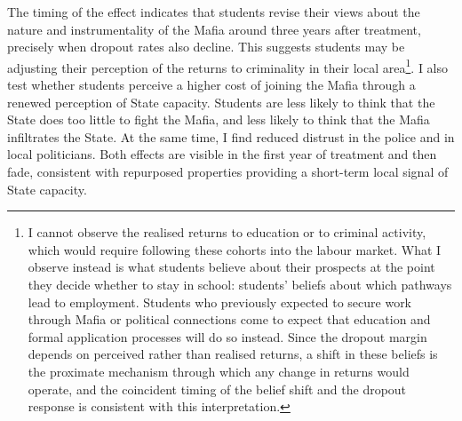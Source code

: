 \documentclass[12pt]{article}
\theoremstyle{plain}
\theoremstyle{plain}
\theoremstyle{plain}
\theoremstyle{definition}
\theoremstyle{plain}
\theoremstyle{definition}
\theoremstyle{plain}
\theoremstyle{remark}
\theoremstyle{definition}
\theoremstyle{definition}
\theoremstyle{plain}
\begin{document}
The timing of the effect indicates that students revise their views about the nature and instrumentality of the Mafia around three years after treatment, precisely when dropout rates also decline. This suggests students may be adjusting their perception of the returns to criminality in their local area\footnote{I cannot observe the realised returns to education or to criminal activity, which would require following these cohorts into the labour market. What I observe instead is what students believe about their prospects at the point they decide whether to stay in school: students' beliefs about which pathways lead to employment. Students who previously expected to secure work through Mafia or political connections come to expect that education and formal application processes will do so instead. Since the dropout margin depends on perceived rather than realised returns, a shift in these beliefs is the proximate mechanism through which any change in returns would operate, and the coincident timing of the belief shift and the dropout response is consistent with this interpretation.}. 
I also test whether students perceive a higher cost of joining the Mafia through a renewed perception of State capacity. Students are less likely to think that the State does too little to fight the Mafia, and less likely to think that the Mafia infiltrates the State. At the same time, I find reduced distrust in the police and in local politicians. Both effects are visible in the first year of treatment and then fade, consistent with repurposed properties providing a short-term local signal of State capacity. \\
\end{document}
